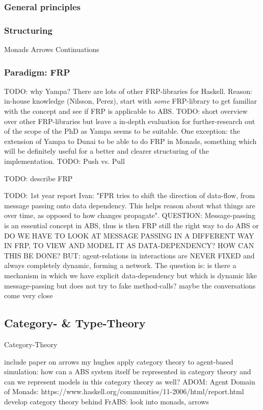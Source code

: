 \subsubsection{General principles}
\subsubsection{Structuring}
Monads
Arrows
Continuations
\subsubsection{Paradigm: FRP}
TODO: why Yampa? There are lots of other FRP-libraries for Haskell. Reason: in-house knowledge (Nilsson, Perez), start with \textit{some} FRP-library to get familiar with the concept and see if FRP is applicable to ABS. TODO: short overview over other FRP-libraries but leave a in-depth evaluation for further-research out of the scope of the PhD as Yampa seems to be suitable. One exception: the extension of Yampa to Dunai to be able to do FRP in Monads, something which will be definitely useful for a better and clearer structuring of the implementation.
TODO: Push vs. Pull

TODO: describe FRP

TODO: 1st year report Ivan: "FPR tries to shift the direction of data-flow, from message passing onto data dependency. This helps reason about what things are over time, as opposed to how changes propagate". QUESTION: Message-passing is an essential concept in ABS, thus is then FRP still the right way to do ABS or DO WE HAVE TO LOOK AT MESSAGE PASSING IN A DIFFERENT WAY IN FRP, TO VIEW AND MODEL IT AS DATA-DEPENDENCY? HOW CAN THIS BE DONE?
BUT: agent-relations in interactions are NEVER FIXED and always completely dynamic, forming a network. The question is: is there a mechanism in which we have explicit data-dependency but which is dynamic like message-passing but does not try to fake method-calls? maybe the conversations come very close


\subsection{Category- \& Type-Theory}
Category-Theory \cite{Pierce1991} \cite{spivak_category_2014}

include paper on arrows my hughes
apply category theory to agent-based simulation: how can a ABS system itself be represented in category theory and can we represent models in this category theory as well?
ADOM: Agent Domain of Monads: https://www.haskell.org/communities/11-2006/html/report.html
develop category theory behind FrABS: look into monads, arrows


